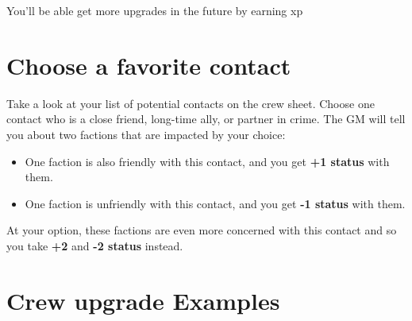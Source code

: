 \documentclass[11pt,oneside]{book}
\begin{document}
You’ll be able get more upgrades in the future by earning xp

\section{Choose a favorite contact}

Take a look at your list of potential contacts on the crew sheet. Choose one contact who is a close friend, long-time ally, or partner in crime. The GM will tell you about two factions that are impacted by your choice:

\begin{itemize}
	\item One faction is also friendly with this contact, and you get \textbf{+1 status} with them.
	\item One faction is unfriendly with this contact, and you get \textbf{-1 status} with them.
\end{itemize}

At your option, these factions are even more concerned with this contact and so you take \textbf{+2} and \textbf{-2 status} instead.

\section{Crew upgrade Examples}
\end{document}
